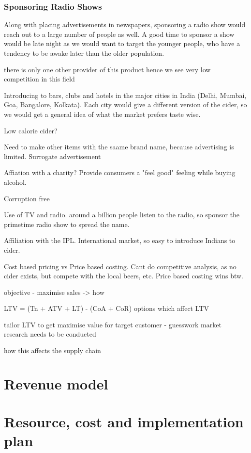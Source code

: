 \documentclass{article}
\begin{document}
\subsubsection{Sponsoring Radio Shows}
Along with placing advertisements in newspapers, sponsoring a radio show would reach
out to a large number of people as well. A good time to sponsor a show would be
late night as we would want to target the younger people, who have a tendency to
be awake later than the older population.
\newpage

there is only one other provider of this product hence we see very low competition in this field

Introducing to bars, clubs and hotels in the major cities in India (Delhi, Mumbai, Goa,
Bangalore, Kolkata). Each city would give a different version of the cider, so we would
get a general idea of what the market prefers taste wise.

Low calorie cider?

Need to make other items with the saame brand name, because advertising is limited. Surrogate advertisement

Affiation with a charity? Provide consumers a "feel good" feeling while buying alcohol.

Corruption free

Use of TV and radio. around a billion people listen to the radio, so sponsor the primetime radio
show to spread the name.

Affiliation with the IPL. International market, so easy to introduce Indians to cider.

Cost based pricing vs Price based costing. Cant do competitive analysis, as no cider exists, but compete with
the local beers, etc. Price based costing wins btw.

objective - maximise sales -> how

LTV = (Tn + ATV + LT) - (CoA + CoR)
options which affect LTV

tailor LTV to get maximise value for target customer - guesswork market research
needs to be conducted

how this affects the supply chain
\section{Revenue model}
\section{Resource, cost and implementation plan}
\end{document}
